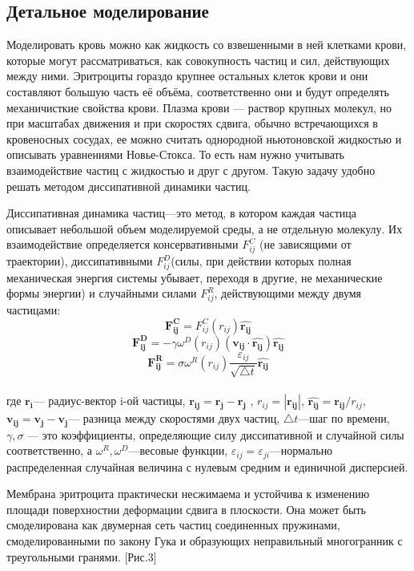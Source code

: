 \documentclass[a4paper, 14pt]{article}
\begin{document}
\subsection{Детальное моделирование}
Моделировать кровь можно как жидкость со взвешенными в ней клетками крови, которые могут рассматриваться, как совокупность частиц и сил, действующих между ними. Эритроциты гораздо крупнее остальных клеток крови и они составляют большую часть её объёма, соответственно они и будут определять механичисткие свойства крови. Плазма крови — раствор крупных молекул, но при масштабах движения и при скоростях сдвига, обычно встречающихся в кровеносных сосудах, ее можно считать однородной ньютоновской жидкостью  и описывать уравнениями Новье-Стокса. То есть нам нужно учитывать взаимодействие частиц с жидкостью и друг с другом. Такую задачу удобно решать методом диссипативной динамики частиц.

Диссипативная динамика частиц—это метод, в котором каждая частица описывает небольшой объем моделируемой среды, а не отдельную молекулу. Их взаимодействие определяется консервативными $F^C_{ij}$ (не зависящими от 
траектории), диссипативными $F^D_{ij}$(силы, при действии которых полная механическая энергия  системы убывает, переходя в другие, не механические формы энергии) и случайными силами $F^R_{ij}$, действующими между двумя частицами:
$$\mathbf{F^C_{ij}}=F^C_{ij}(r_{ij})\mathbf{\hat{r_{ij}}}$$
$$\mathbf{F^D_{ij}}=-\gamma \omega^D(r_{ij}) (\mathbf{v_{ij}} \cdot \mathbf{\hat{r_{ij}}})\mathbf{\hat{r_{ij}}}$$
$$\mathbf{F^R_{ij}}=\sigma \omega^R(r_{ij}) \dfrac{\varepsilon_{ij}}{\sqrt{\bigtriangleup t}} \mathbf{\hat{r_{ij}}}$$\\
где $\mathbf{r_{i}}$— радиус-вектор i-ой частицы, $\mathbf{r_{ij}}=\mathbf{r_{j}} - \mathbf{r_{j}}$ ,
$r_{ij}=|\mathbf{r_{ij}}|$,
$\mathbf{\hat{r_{ij}}}=\mathbf{r_{ij}}/{r_{ij}}$,
$\mathbf{v_{ij}}=\mathbf{v_{j} - \mathbf{v_{j}}}$— разница между скоростями двух частиц, $\bigtriangleup t$—шаг по времени, $\gamma, \sigma$ — это  коэффициенты, определяющие силу диссипативной и случайной силы соответственно, а $\omega^R,\omega^D$—весовые функции,
${\varepsilon_{ij}={\varepsilon_{ji}}}$—нормально распределенная случайная величина с нулевым средним и единичной дисперсией.

Мембрана эритроцита практически несжимаема и устойчива к изменению площади поверхностии деформации сдвига в плоскости. Она может быть смоделирована как двумерная сеть частиц соединенных пружинами, смоделированными по закону Гука и образующих неправильный многогранник с треугольными гранями. [Рис.3]
\end{document}
